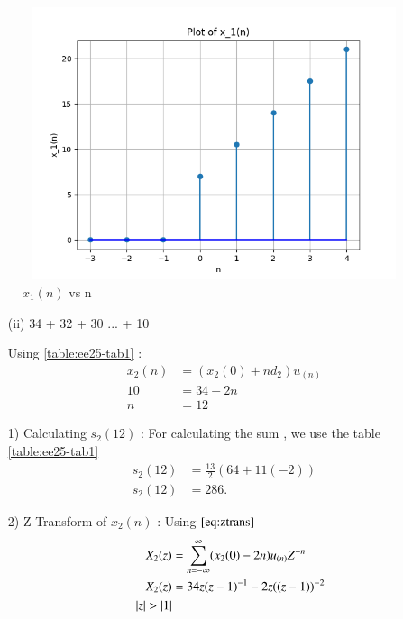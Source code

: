 \documentclass[journal,12pt,onecolumn]{IEEEtran}
\theoremstyle{remark}
\begin{document}
\newpage
    \begin{figure}[!ht]
    \centering
\graphicspath{ {figs/} }
\includegraphics[width=12cm, height=8cm]{graph_1}
\caption{ $x_1(n)$ vs n }
\label{graph:ee25-g2}
\end{figure}
\vspace{0.5cm}


\begin{enumerate}
\vspace{0.5cm}
\item[(ii)]
 34 + 32 + 30 ... + 10
\vspace{0.5cm}

Using \ref{table:ee25-tab1} :
\begin{align}
x_2(n) &= (x_2(0) + nd_2)u_{(n)}\\
     10 &= 34 -2n\\
     n &= 12 
     \end{align}
\end{enumerate}

\begin{enumerate}
\item[1)] 
Calculating $s_2(12)$ :
For calculating the sum , we use the table \ref{table:ee25-tab1}
\begin{align}
 s_2{(12)} &= \frac{13}{2}(64+11(-2))\\
 s_2{(12)} &= 286.
 \end{align}
    \vspace{0.5cm}
\end{enumerate}

\begin{enumerate}
\item[2)] 
Z-Transform of $x_2(n)$ :
Using $\eqref{eq:ztrans}$
\begin{align}
X_2(z) &= \sum_{n=-\infty}^{\infty}(x_2(0) -2n)u_{(n)}Z^{-n} \\
 X_2(z) &= 34z(z-1)^{-1}-
       2z((z-1))^{-2} \label{eq:ee25-6}\\
\quad \left\vert z\right\vert>\left\vert1\right\vert 
\end{align}
\end{enumerate}
\end{document}
